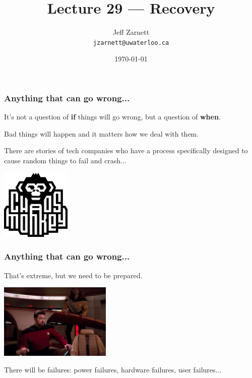

\title{Lecture 29 --- Recovery }

\author{Jeff Zarnett \\ \small \texttt{jzarnett@uwaterloo.ca}}
\date{\today}




\begin{frame}
  \titlepage

 \end{frame}


\begin{frame}
\frametitle{Anything that can go wrong...}

It's not a question of \textbf{if} things will go wrong, but a question of \textbf{when}. 

Bad things will happen and it matters how we deal with them. 

There are stories of tech companies who have a process specifically designed to cause random things to fail and crash... 

\begin{center}
	\includegraphics[width=0.25\textwidth]{images/chaosmonkey.png}
\end{center}

 \end{frame}


\begin{frame}
\frametitle{Anything that can go wrong...}

That's extreme, but we need to be prepared. 

\begin{center}
	\includegraphics[width=0.4\textwidth]{images/redalert.jpg}
\end{center}

There will be failures: power failures, hardware failures, user failures...




\end{frame}

